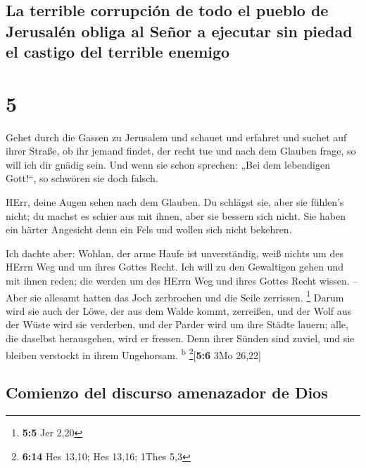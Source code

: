 \hypertarget{la-terrible-corrupciuxf3n-de-todo-el-pueblo-de-jerusaluxe9n-obliga-al-seuxf1or-a-ejecutar-sin-piedad-el-castigo-del-terrible-enemigo}{%
\subsection{La terrible corrupción de todo el pueblo de Jerusalén obliga
al Señor a ejecutar sin piedad el castigo del terrible
enemigo}\label{la-terrible-corrupciuxf3n-de-todo-el-pueblo-de-jerusaluxe9n-obliga-al-seuxf1or-a-ejecutar-sin-piedad-el-castigo-del-terrible-enemigo}}

\hypertarget{section-4}{%
\section{5}\label{section-4}}

 Gehet durch die Gassen zu Jerusalem und schauet und
erfahret und suchet auf ihrer Straße, ob ihr jemand findet, der recht
tue und nach dem Glauben frage, so will ich dir gnädig sein.
 Und wenn sie schon sprechen: „Bei dem lebendigen
Gott!{}``, so schwören sie doch falsch.

 HErr, deine Augen sehen nach dem Glauben. Du schlägst
sie, aber sie fühlen's nicht; du machst es schier aus mit ihnen, aber
sie bessern sich nicht. Sie haben ein härter Angesicht denn ein Fels und
wollen sich nicht bekehren.

 Ich dachte aber: Wohlan, der arme Haufe ist unverständig,
weiß nichts um des HErrn Weg und um ihres Gottes Recht. 
Ich will zu den Gewaltigen gehen und mit ihnen reden; die werden um des
HErrn Weg und ihres Gottes Recht wissen. -- Aber sie allesamt hatten das
Joch zerbrochen und die Seile zerrissen. \footnote{\textbf{5:5} Jer 2,20}
 Darum wird sie auch der Löwe, der aus dem Walde kommt,
zerreißen, und der Wolf aus der Wüste wird sie verderben, und der Parder
wird um ihre Städte lauern; alle, die daselbst herausgehen, wird er
fressen. Denn ihrer Sünden sind zuviel, und sie bleiben verstockt in
ihrem Ungehorsam. \textsuperscript{b} \footnote{\textbf{6:14} Hes 13,10;
  Hes 13,16; 1Thes 5,3}{[}\textbf{5:6} 3Mo 26,22{]}

\hypertarget{comienzo-del-discurso-amenazador-de-dios}{%
\subsection{Comienzo del discurso amenazador de
Dios}\label{comienzo-del-discurso-amenazador-de-dios}}

